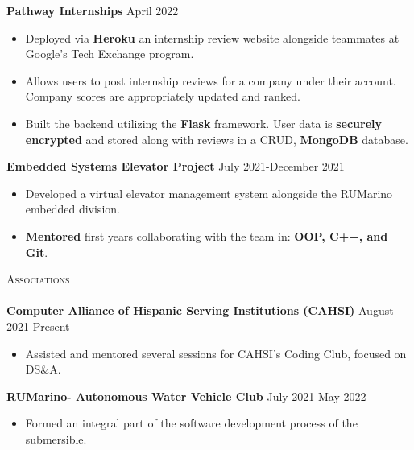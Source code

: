\documentclass[a4paper]{article}
\newcommand{\lineunder} {
    \vspace*{-8pt} \\
    \hspace*{-18pt} \hrulefill \\
}
\newcommand{\header} [1] {
    {\hspace*{-18pt}\vspace*{6pt} \textsc{#1}}
    \vspace*{-6pt} \lineunder
}
\begin{document}
{\textbf{Pathway Internships}} \hfill April 2022 \\
\vspace{-2mm}
\begin{itemize} \itemsep -1pt
\item Deployed via \textbf{Heroku} an internship review website alongside teammates at Google's Tech Exchange program.

\item Allows users to post internship reviews for a company under their account. Company scores are appropriately updated and ranked.

\item Built the backend utilizing the \textbf{Flask} framework. User data is \textbf{securely encrypted} and stored along with reviews in a CRUD, \textbf{MongoDB} database. 
\end{itemize}

{\textbf{Embedded Systems Elevator Project}} \hfill \hfill July 2021-December 2021\\
\vspace{-2mm}

\begin{itemize} \itemsep -1pt
\item Developed a virtual elevator management system alongside the RUMarino embedded division.

\item \textbf{Mentored} first years collaborating with the team in: \textbf{OOP, C++, and Git}.
\end{itemize}
\vspace*{-0.5mm}

\header{Associations}

\vspace{-1mm} \textbf{Computer Alliance of Hispanic Serving Institutions (CAHSI)} \hfill August 2021-Present\\
\begin{itemize} \itemsep -1pt
\vspace{-2mm}
\item Assisted and mentored several sessions for CAHSI's Coding Club, focused on DS\&A. \\
\end{itemize}

\vspace{-1mm}
\textbf{RUMarino- Autonomous Water Vehicle Club} \hfill July 2021-May 2022 \\ 
\vspace{-2mm}
\begin{itemize} \itemsep -1pt
\item Formed an integral part of the software development process of the submersible. \\ 
\end{itemize}
 


\ 
\end{document}
